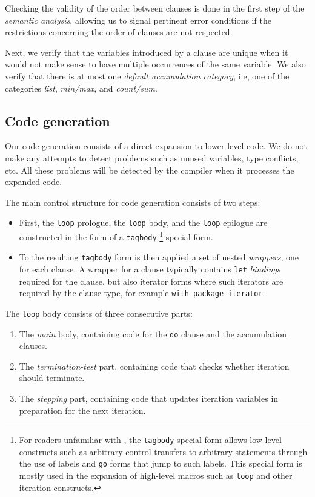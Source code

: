 Checking the validity of the order between clauses is done in the
first step of the \emph{semantic analysis}, allowing us to signal
pertinent error conditions if the restrictions concerning the order of
clauses are not respected.

Next, we verify that the variables introduced by a clause are unique
when it would not make sense to have multiple occurrences of the same
variable.  We also verify that there is at most one \emph{default
accumulation category}, i.e, one of the categories \emph{list},
\emph{min/max}, and \emph{count/sum}.

\subsection{Code generation}
\label{sec-our-technique-code generation}

Our code generation consists of a direct expansion to lower-level
\commonlisp{} code.  We do not make any attempts to detect problems
such as unused variables, type conflicts, etc.  All these problems
will be detected by the compiler when it processes the expanded code.

The main control structure for code generation consists of two steps:

\begin{itemize}
\item First, the \texttt{loop} prologue, the \texttt{loop} body, and
  the \texttt{loop} epilogue are constructed in the form of a
  \texttt{tagbody}%
  \footnote{For readers unfamiliar with \commonlisp{}, the
    \texttt{tagbody} special form allows low-level constructs such as
    arbitrary control transfers to arbitrary statements through the
    use of labels and \texttt{go} forms that jump to such labels.
    This special form is mostly used in the expansion of high-level
    macros such as \texttt{loop} and other iteration constructs.}
  special form.
\item To the resulting \texttt{tagbody} form is then applied a set of
  nested \emph{wrappers}, one for each clause.  A wrapper for a clause
  typically contains \texttt{let} \emph{bindings} required for the
  clause, but also iterator forms where such iterators are required by
  the clause type, for example \texttt{with-package-iterator}.
\end{itemize}

The \texttt{loop} body consists of three consecutive parts:

\begin{enumerate}
\item The \emph{main} body, containing code for the \texttt{do} clause
  and the accumulation clauses.
\item The \emph{termination-test} part, containing code that checks
  whether iteration should terminate.
\item The \emph{stepping} part, containing code that updates iteration
  variables in preparation for the next iteration.
\end{enumerate}

